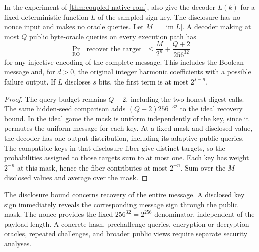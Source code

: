 \begin{corollary}
\label{cor:coupled-native-rom-disclosure}
In the experiment of \cref{thm:coupled-native-rom}, also give the decoder
\(L(k)\) for a fixed deterministic function \(L\) of the sampled sign key.
The disclosure has no nonce input and makes no oracle queries. Let
\(M=|\operatorname{im} L|\). A decoder making at most \(Q\) public byte-oracle
queries on every execution path has
\[
 \Pr_{\mathrm{RO}}[\text{recover the target}]
 \leq \frac{M}{2^n}+\frac{Q+2}{256^{32}}
\]
for any injective encoding of the complete message. This includes the
Boolean message and, for \(d>0\), the original integer harmonic coefficients
with a possible failure output. If \(L\) discloses \(s\) bits, the first term
is at most \(2^{s-n}\).
\end{corollary}

\begin{proof}
The query budget remains \(Q+2\), including the two honest digest calls.
The same hidden-seed comparison adds \((Q+2)256^{-32}\) to the ideal
recovery bound. In the ideal game the mask is uniform independently of the
key, since it permutes the uniform message for each key. At a fixed mask
and disclosed value, the decoder has one output distribution, including
its adaptive public queries. The compatible keys in that disclosure fiber
give distinct targets, so the probabilities assigned to those targets
sum to at most one. Each key has weight \(2^{-n}\) at this mask, hence the
fiber contributes at most \(2^{-n}\). Sum over the \(M\) disclosed values
and average over the mask.
\end{proof}

The disclosure bound concerns recovery of the entire message. A disclosed
key sign immediately reveals the corresponding message sign through the
public mask. The nonce provides the fixed \(256^{32}=2^{256}\) denominator,
independent of the payload length. A concrete hash, prechallenge queries,
encryption or decryption oracles, repeated challenges, and broader public
views require separate security analyses.
